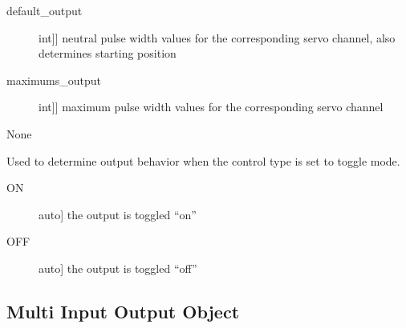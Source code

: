 \documentclass[letterpaper,10pt,english]{sphinxmanual}
\begin{document}
\begin{fulllineitems}
\begin{fulllineitems}
\begin{description}
\item[{default\_output}] \leavevmode{[}{[}int{]}{]}
\sphinxAtStartPar
neutral pulse width values for the corresponding servo channel, also determines starting position

\item[{maximums\_output}] \leavevmode{[}{[}int{]}{]}
\sphinxAtStartPar
maximum pulse width values for the corresponding servo channel

\end{description}

\sphinxAtStartPar
None

\end{fulllineitems}


\end{fulllineitems}


\begin{fulllineitems}
\label{\detokenize{base:OutputObject.ToggleState}}
\sphinxAtStartPar
Used to determine output behavior when the control type is set to toggle mode.
\begin{description}
\item[{ON}] \leavevmode{[}auto{]}
\sphinxAtStartPar
the output is toggled “on”

\item[{OFF}] \leavevmode{[}auto{]}
\sphinxAtStartPar
the output is toggled “off”

\end{description}

\end{fulllineitems}



\subsection{Multi Input Output Object}
\label{\detokenize{base:module-MultiInputOutputObject}}\label{\detokenize{base:multi-input-output-object}}
\end{document}
